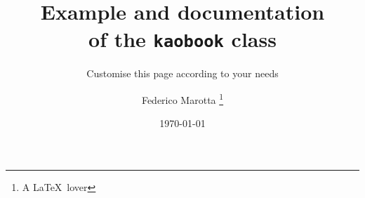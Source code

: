 \documentclass[
	fontsize=10pt, %
	twoside=false,
	open=any,
	numbers=noenddot,
]{kaobook}
\begin{document}

\titlehead{The \texttt{kaobook} class}
\subject{Use this document as a template}

\title[Example and documentation of the {\normalfont\texttt{kaobook}} class]{Example and documentation \\ of the {\normalfont\texttt{kaobook}} class}
\subtitle{Customise this page according to your needs}

\author[Federico Marotta]{Federico Marotta \thanks{A \LaTeX\ lover}}

\date{\today}

\publishers{An Awesome Publisher}


%
%
%
%

\frontmatter %

%



\end{document}
